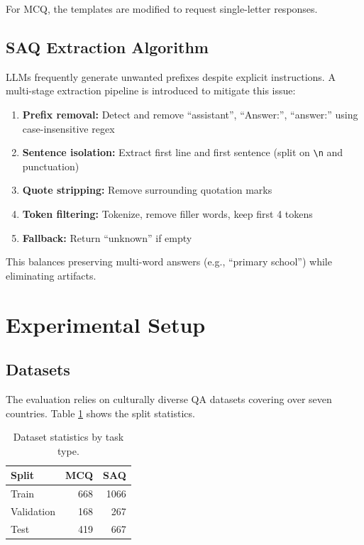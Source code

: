 \documentclass[11pt,a4paper,twocolumn]{article}
\begin{document}
For MCQ, the templates are modified to request single-letter responses.

\subsection{SAQ Extraction Algorithm}

LLMs frequently generate unwanted prefixes despite explicit instructions. A multi-stage extraction pipeline is introduced to mitigate this issue:

\begin{enumerate}
\item \textbf{Prefix removal:} Detect and remove ``assistant'', ``Answer:'', ``answer:'' using case-insensitive regex
\item \textbf{Sentence isolation:} Extract first line and first sentence (split on \texttt{\textbackslash n} and punctuation)
\item \textbf{Quote stripping:} Remove surrounding quotation marks
\item \textbf{Token filtering:} Tokenize, remove filler words, keep first 4 tokens
\item \textbf{Fallback:} Return ``unknown'' if empty
\end{enumerate}

This balances preserving multi-word answers (e.g., ``primary school'') while eliminating artifacts.

\section{Experimental Setup}

\subsection{Datasets}

The evaluation relies on culturally diverse QA datasets covering over seven countries. Table \ref{tab:data_stats} shows the split statistics.

\begin{table}[h]
\centering
\small
\begin{tabular}{lrr}
\toprule
\textbf{Split} & \textbf{MCQ} & \textbf{SAQ} \\
\midrule
Train & 668 & 1066 \\
Validation & 168 & 267 \\
Test & 419 & 667 \\
\bottomrule
\end{tabular}
\caption{Dataset statistics by task type.}
\label{tab:data_stats}
\end{table}
\end{document}
